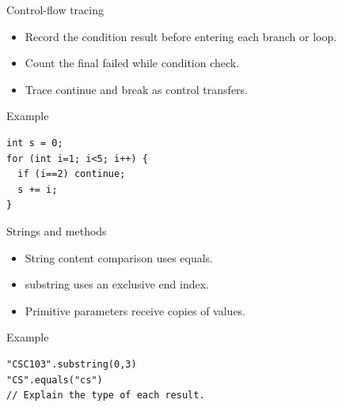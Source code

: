 \documentclass[10pt,aspectratio=169]{beamer}
\begin{document}
\begin{frame}[fragile,t]{Control-flow tracing}
\begin{itemize}
\item Record the condition result before entering each branch or loop.
\item Count the final failed while condition check.
\item Trace continue and break as control transfers.
\end{itemize}
\vspace{1mm}\begin{block}{Example}
\begin{lstlisting}
int s = 0;
for (int i=1; i<5; i++) {
  if (i==2) continue;
  s += i;
}
\end{lstlisting}
\end{block}
\end{frame}

\begin{frame}[fragile,t]{Strings and methods}
\begin{itemize}
\item String content comparison uses equals.
\item substring uses an exclusive end index.
\item Primitive parameters receive copies of values.
\end{itemize}
\vspace{1mm}\begin{block}{Example}
\begin{lstlisting}
"CSC103".substring(0,3)
"CS".equals("cs")
// Explain the type of each result.
\end{lstlisting}
\end{block}
\end{frame}
\end{document}
